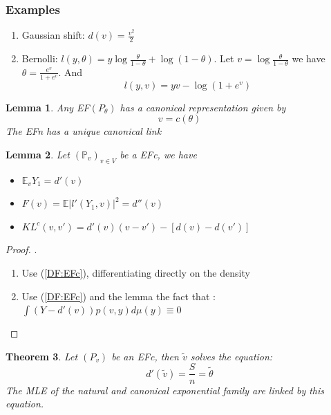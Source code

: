\documentclass[a4paper,12pt, oneside, fleqn]{book}
\newtheorem{theorem}{Theorem}[section]
\newtheorem{lemma}[theorem]{Lemma}
\theoremstyle{definition}
\theoremstyle{remark}
\begin{document}
\subsubsection*{Examples}
\begin{enumerate}
	\item Gaussian shift: $d(v)= \frac{v^2}{2}$
	\item Bernolli: $l(y, \theta) = y \log \frac{\theta}{1 - \theta} + \log(1 - \theta)$. Let $v = \log \frac{\theta}{1 - \theta}$ we have $\theta = \frac{e^v}{1 + e^v}$. And 
		\begin{equation*}
			l(y, v) = yv - \log (1 + e^v)
		\end{equation*}
\end{enumerate}

\begin{lemma}
	Any EF$(P_\theta)$ has a canonical representation given by 
	\begin{equation*}
		v = c(\theta)
	\end{equation*}
	The EFn has a unique canonical link
\end{lemma}



\begin{lemma} \label{PP:EFc}
	Let $(\mathbb{P}_v)_{v \in V}$ be a EFc, we have
	\begin{itemize}
		\item $\mathbb{E}_v Y_1 = d'(v)$
		\item $F(v) = \mathbb{E}|l'(Y_1, v)|^2 = d''(v)$
		\item $KL^c(v, v')= d'(v)(v - v') - [d(v) - d(v')]$
	\end{itemize}
\end{lemma}

\begin{proof}.
	\begin{enumerate}
		\item Use (\ref{DF:EFc}), differentiating directly on the density
		\item Use (\ref{DF:EFc}) and the lemma the fact that : $ \int (Y - d'(v)) p(v, y) d\mu(y) \equiv 0$
	\end{enumerate}
\end{proof}

\begin{theorem}
	Let $(P_v)$ be an EFc, then $\tilde{v}$ solves the equation:
	\begin{equation*}
		d'(\tilde{v}) = \frac{S}{n} = \tilde{\theta}
	\end{equation*}
	The MLE of the natural and canonical exponential family are linked by this equation.
\end{theorem}
\end{document}
